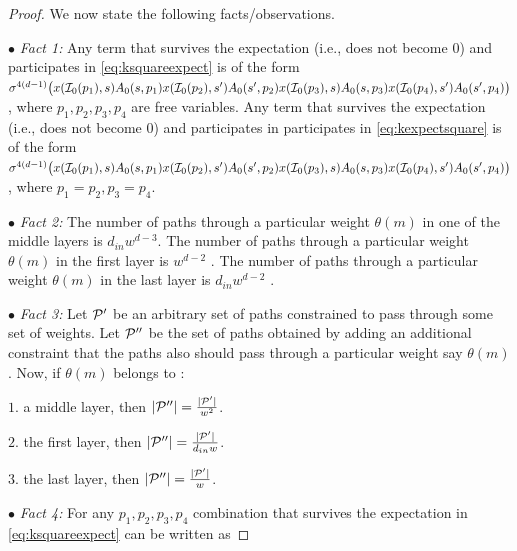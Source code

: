 \begin{appendix}
\begin{proof}
We now state the following facts/observations.

$\bullet$ \emph{Fact 1:} Any term that survives the expectation (i.e., does not become $0$) and participates in \eqref{eq:ksquareexpect} is of the form $\sigma^{4(d-1)}\big(x(\I_0(p_1),s)A_0(s,p_1)x(\I_0(p_2),s')A_0(s',p_2)x(\I_0(p_3),s)A_0(s,p_3)x(\I_0(p_4),s')A_0(s',p_4)\big)$, where $p_1,p_2,p_3,p_4$ are free variables. Any term that survives the expectation (i.e., does not become $0$) and participates in participates in \eqref{eq:kexpectsquare} is of the form $\sigma^{4(d-1)}\big(x(\I_0(p_1),s)A_0(s,p_1)x(\I_0(p_2),s')A_0(s',p_2)x(\I_0(p_3),s)A_0(s,p_3)x(\I_0(p_4),s')A_0(s',p_4)\big)$, where $p_1=p_2,p_3=p_4$.

$\bullet$ \emph{Fact 2:} The number of paths through a particular weight $\theta(m)$ in one of the middle layers is $d_{in}w^{d-3}$. The number of paths through a particular weight $\theta(m)$ in the first layer is $w^{d-2}$ . The number of paths through a particular weight $\theta(m)$ in the last layer is $d_{in}w^{d-2}$ .


$\bullet$ \emph{Fact 3:} Let $\P'$ be an arbitrary set of paths constrained to pass through some set of weights. Let $\P''$ be the set of paths obtained by adding an additional constraint that the paths also should pass through a particular weight say $\theta(m)$. Now, if $\theta(m)$ belongs to :

$1.$ a middle layer, then $|\P''|=\frac{|\P'|}{w^2}$.

$2.$ the first layer, then $|\P''|=\frac{|\P'|}{d_{in}w}$.

$3.$  the last layer, then $|\P''|=\frac{|\P'|}{w}$.

$\bullet$ \emph{Fact 4:} For any $p_1,p_2,p_3,p_4$ combination that survives the expectation in \eqref{eq:ksquareexpect} can be written as 


\end{proof}
\end{appendix}
